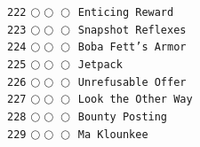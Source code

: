 \documentclass[a4paper,landscape]{article}
\begin{document}
\begin{multicols*}{5}
\texttt{222} \(\bigcirc\!\bigcirc\!\bigcirc\)  \texttt{Enticing Reward} \vspace{-0.3mm}\\ 
\texttt{223} \(\bigcirc\!\bigcirc\!\bigcirc\)  \texttt{Snapshot Reflexes} \vspace{-0.3mm}\\ 
\texttt{224} \(\bigcirc\!\bigcirc\!\bigcirc\)  \texttt{Boba Fett’s Armor} \vspace{-0.3mm}\\ 
\texttt{225} \(\bigcirc\!\bigcirc\!\bigcirc\)  \texttt{Jetpack} \vspace{-0.3mm}\\ 
\texttt{226} \(\bigcirc\!\bigcirc\!\bigcirc\)  \texttt{Unrefusable Offer} \vspace{-0.3mm}\\ 
\texttt{227} \(\bigcirc\!\bigcirc\!\bigcirc\)  \texttt{Look the Other Way} \vspace{-0.3mm}\\ 
\texttt{228} \(\bigcirc\!\bigcirc\!\bigcirc\)  \texttt{Bounty Posting} \vspace{-0.3mm}\\ 
\texttt{229} \(\bigcirc\!\bigcirc\!\bigcirc\)  \texttt{Ma Klounkee} \vspace{-0.3mm}\\ 

\end{multicols*}
\end{document}

